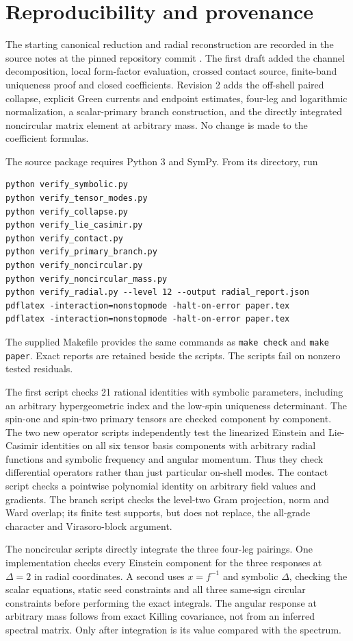 \documentclass[11pt,a4paper]{article}
\numberwithin{equation}{section}
\theoremstyle{remark}\newtheorem{remark}[theorem]{Remark}
\begin{document}
\section{Reproducibility and provenance}

The starting canonical reduction and radial reconstruction are recorded in the source notes at the pinned repository commit \cite{notes}. The first draft added the channel decomposition, local form-factor evaluation, crossed contact source, finite-band uniqueness proof and closed coefficients. Revision 2 adds the off-shell paired collapse, explicit Green currents and endpoint estimates, four-leg and logarithmic normalization, a scalar-primary branch construction, and the directly integrated noncircular matrix element at arbitrary mass. No change is made to the coefficient formulas.

The source package requires Python 3 and SymPy. From its directory, run
\begin{verbatim}
python verify_symbolic.py
python verify_tensor_modes.py
python verify_collapse.py
python verify_lie_casimir.py
python verify_contact.py
python verify_primary_branch.py
python verify_noncircular.py
python verify_noncircular_mass.py
python verify_radial.py --level 12 --output radial_report.json
pdflatex -interaction=nonstopmode -halt-on-error paper.tex
pdflatex -interaction=nonstopmode -halt-on-error paper.tex
\end{verbatim}
The supplied Makefile provides the same commands as \texttt{make check} and \texttt{make paper}. Exact reports are retained beside the scripts. The scripts fail on nonzero tested residuals.

The first script checks 21 rational identities with symbolic parameters, including an arbitrary hypergeometric index and the low-spin uniqueness determinant. The spin-one and spin-two primary tensors are checked component by component. The two new operator scripts independently test the linearized Einstein and Lie-Casimir identities on all six tensor basis components with arbitrary radial functions and symbolic frequency and angular momentum. Thus they check differential operators rather than just particular on-shell modes. The contact script checks a pointwise polynomial identity on arbitrary field values and gradients. The branch script checks the level-two Gram projection, norm and Ward overlap; its finite test supports, but does not replace, the all-grade character and Virasoro-block argument.

The noncircular scripts directly integrate the three four-leg pairings. One implementation checks every Einstein component for the three responses at $\Delta=2$ in radial coordinates. A second uses $x=f^{-1}$ and symbolic $\Delta$, checking the scalar equations, static seed constraints and all three same-sign circular constraints before performing the exact integrals. The angular response at arbitrary mass follows from exact Killing covariance, not from an inferred spectral matrix. Only after integration is its value compared with the spectrum.
\end{document}
